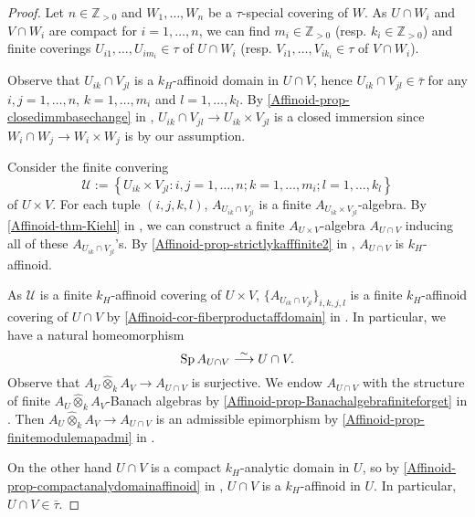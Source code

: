 \begin{proof}
    Let $n\in \mathbb{Z}_{>0}$ and $W_1,\ldots,W_n$ be a $\tau$-special covering of $W$.
    As $U\cap W_i$ and $V\cap W_i$ are compact for $i=1,\ldots,n$, we can find $m_i\in \mathbb{Z}_{>0}$ (resp. $k_i\in \mathbb{Z}_{>0}$) and finite coverings $U_{i1},\ldots,U_{im_i}\in \tau$ of $U\cap W_i$ (resp. $V_{i1},\ldots,V_{ik_i}\in \tau$ of $V\cap W_i$). 

    Observe that $U_{ik}\cap V_{jl}$ is a $k_H$-affinoid domain in $U\cap V$, hence $U_{ik}\cap V_{jl}\in \bar{\tau}$ for any $i,j=1,\ldots,n$, $k=1,\ldots,m_i$ and $l=1,\ldots,k_l$. By \cref{Affinoid-prop-closedimmbasechange} in , $U_{ik}\cap V_{jl}\rightarrow U_{ik}\times V_{jl}$ is a closed immersion since $W_i\cap W_j\rightarrow W_i\times W_j$ is by our assumption. 
    
    Consider the finite convering 
    \[
        \mathcal{U}:=\left\{U_{ik}\times V_{jl}:i,j=1,\ldots,n; k=1,\ldots,m_i; l=1,\ldots,k_l \right\}
    \]
    of $U\times V$. For each tuple $(i,j,k,l)$, $A_{U_{ik}\cap V_{jl}}$ is a finite $A_{U_{ik}\times V_{jl}}$-algebra. By \cref{Affinoid-thm-Kiehl} in , we can construct a finite $A_{U\times V}$-algebra $A_{U\cap V}$ inducing all of these $A_{U_{ik}\cap V_{jl}}$'s. By \cref{Affinoid-prop-strictlykafffinite2} in , $A_{U\cap V}$ is $k_H$-affinoid.

    As $\mathcal{U}$ is a finite $k_H$-affinoid covering of $U\times V$, $\{A_{U_{ik}\cap V_{jl}}\}_{i,k,j,l}$ is a finite $k_H$-affinoid covering of $U\cap V$ by \cref{Affinoid-cor-fiberproductaffdomain} in .
    In particular, we have a natural homeomorphism
    \[
        \operatorname{Sp} A_{U\cap V}\stackrel{\sim}{\longrightarrow} U\cap V.  
    \]
    Observe that $A_U\hat{\otimes}_k A_V \rightarrow A_{U\cap V}$ is surjective. We endow $A_{U\cap V}$ with the structure of finite $A_U\hat{\otimes}_k A_V$-Banach algebras by \cref{Affinoid-prop-Banachalgebrafiniteforget} in . Then $A_U\hat{\otimes}_k A_V \rightarrow A_{U\cap V}$ is an admissible epimorphism by \cref{Affinoid-prop-finitemodulemapadmi} in .

    On the other hand $U\cap V$ is a compact $k_H$-analytic domain in $U$, so by \cref{Affinoid-prop-compactanalydomainaffinoid} in , $U\cap V$ is a $k_H$-affinoid in $U$. In particular, $U\cap V\in \bar{\tau}$.
\end{proof}

